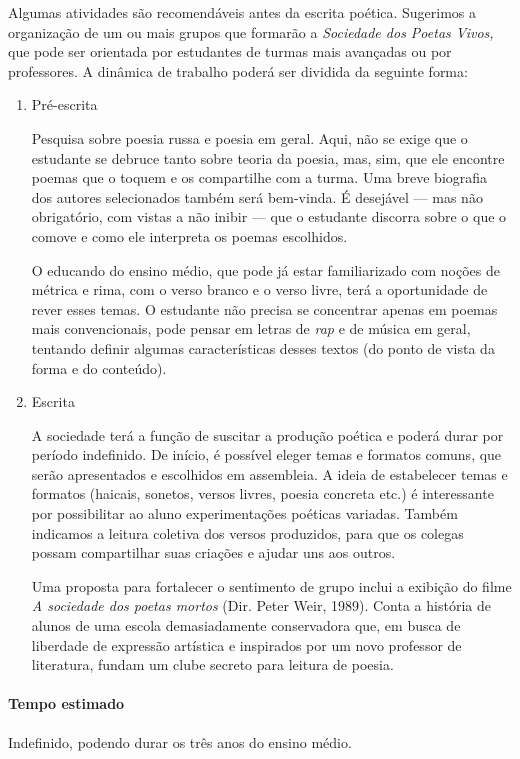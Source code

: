 \documentclass{article}
\begin{document}
Algumas atividades são recomendáveis antes da escrita poética. Sugerimos
a organização de um ou mais grupos que formarão a \emph{Sociedade dos
Poetas Vivos,} que pode ser orientada por estudantes de turmas mais
avançadas ou por professores. A dinâmica de trabalho poderá ser dividida
da seguinte forma:

\begin{enumerate}
\item
Pré-escrita

Pesquisa sobre poesia russa e poesia em geral. Aqui, não se exige que
o estudante se debruce tanto sobre teoria da poesia, mas, sim, que ele
encontre poemas que o toquem e os compartilhe com a turma. Uma breve
biografia dos autores selecionados também será bem-vinda. É desejável
--- mas não obrigatório, com vistas a não inibir --- que o estudante
discorra sobre o que o comove e como ele interpreta os poemas
escolhidos.

O educando do ensino médio, que pode já estar familiarizado com noções
de métrica e rima, com o verso branco e o verso livre, terá a
oportunidade de rever esses temas. O estudante não precisa se concentrar
apenas em poemas mais convencionais, pode pensar em letras de \emph{rap}
e de música em geral, tentando definir algumas características desses
textos (do ponto de vista da forma e do conteúdo).

\item
Escrita

A sociedade terá a função de suscitar a produção poética e poderá durar
por período indefinido. De início, é possível eleger temas e formatos
comuns, que serão apresentados e escolhidos em assembleia. A ideia de
estabelecer temas e formatos (haicais, sonetos, versos livres, poesia
concreta etc.) é interessante por possibilitar ao aluno experimentações
poéticas variadas. Também indicamos a leitura coletiva dos versos
produzidos, para que os colegas possam compartilhar suas criações e
ajudar uns aos outros.

Uma proposta para fortalecer o sentimento de grupo inclui a exibição do
filme \emph{A sociedade dos poetas mortos} (Dir. Peter Weir, 1989).
Conta a história de alunos de uma escola demasiadamente conservadora
que, em busca de liberdade de expressão artística e inspirados por um
novo professor de literatura, fundam um clube secreto para leitura de
poesia.
\end{enumerate}

\paragraph{Tempo estimado} Indefinido, podendo durar os três anos do
ensino médio.
\end{document}
